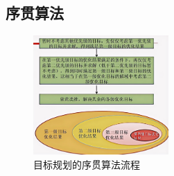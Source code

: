     \subsection{序贯算法}
    \begin{figure}[H]
        \centering
        \includegraphics[width=0.46\textwidth]{./image/28.png}
        \caption{目标规划的序贯算法流程}
        \label{fig:Chapter4_Temporary_Pavilion_1}
    \end{figure}
